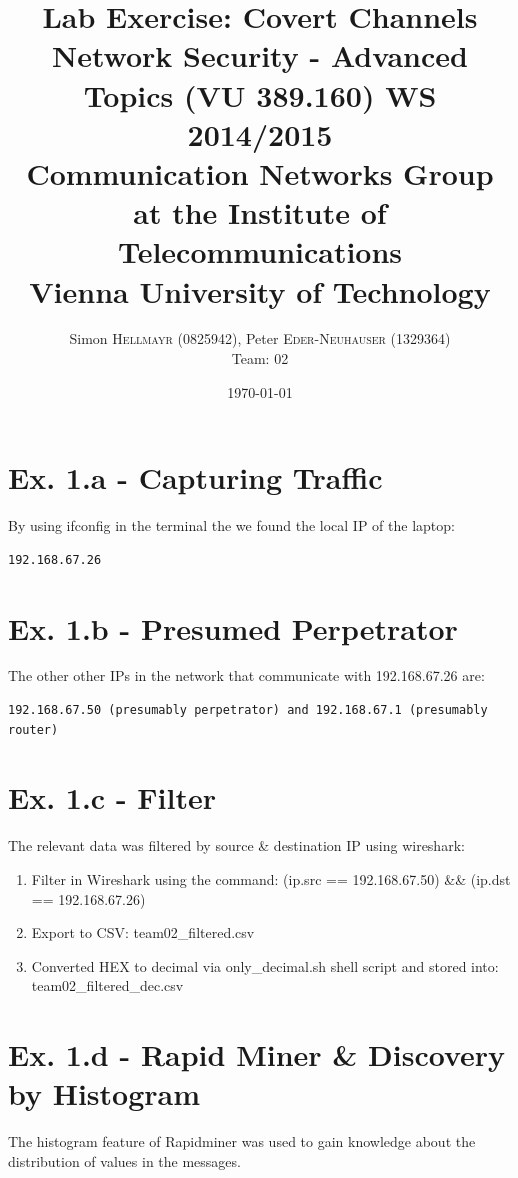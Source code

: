\documentclass{article}
\title{\textbf{Lab Exercise: Covert Channels} \\
Network Security - Advanced Topics (VU 389.160) WS 2014/2015 \\
Communication Networks Group at the Institute of Telecommunications \\
Vienna University of Technology } %
\author{Simon \textsc{Hellmayr (0825942)}, Peter \textsc{Eder-Neuhauser (1329364)} \\[0.7cm] \LARGE Team: 02} %
\date{\today} %
\begin{document}
\maketitle %


\renewcommand{\arraystretch}{2} %
\section*{Ex. 1.a - Capturing Traffic}
By using ifconfig in the terminal the we found the local IP of the laptop:
\begin{verbatim}
192.168.67.26
\end{verbatim}

\section*{Ex. 1.b - Presumed Perpetrator}
The other other IPs in the network that communicate with 192.168.67.26 are:
\begin{verbatim}
192.168.67.50 (presumably perpetrator) and 192.168.67.1 (presumably router)
\end{verbatim}

\section*{Ex. 1.c - Filter}
The relevant data was filtered by source \& destination IP using wireshark:
\begin{enumerate}
	\item Filter in Wireshark using the command: (ip.src == 192.168.67.50) \&\& (ip.dst == 192.168.67.26)
	\item Export to CSV: team02\_filtered.csv
	\item Converted HEX to decimal via only\_decimal.sh shell script and stored into: team02\_filtered\_dec.csv
\end{enumerate} 

\section*{Ex. 1.d - Rapid Miner \& Discovery by Histogram}
The histogram feature of Rapidminer was used to gain knowledge about the distribution of values in the messages.
\end{document}
